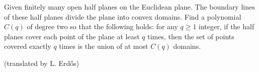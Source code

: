 Given finitely many open half planes on the Euclidean plane. The boundary lines of these half planes divide the plane into convex domains. Find a polynomial $C(q)$ of degree two so that the following holds: for any $q\ge 1$ integer, if the half planes cover each point of the plane at least $q$ times, then the set of points covered exactly $q$ times is the union of at most $C(q)$ domains.

(translated by L. Erdős)